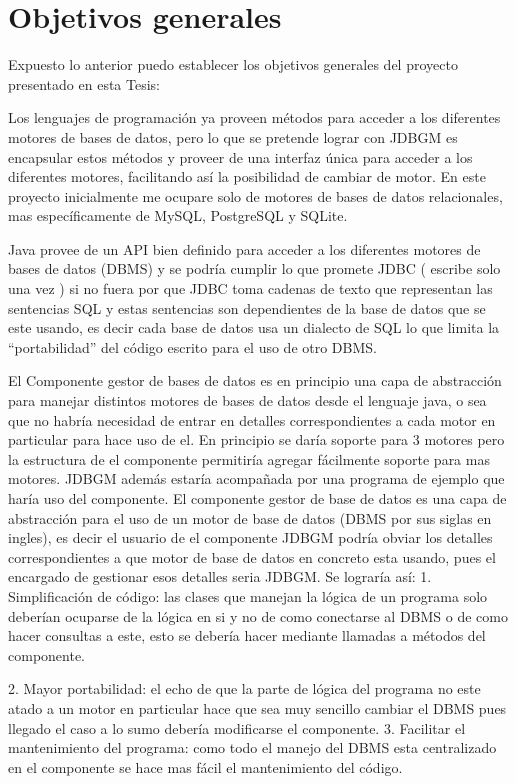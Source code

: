 \section{Objetivos generales}
Expuesto lo anterior puedo establecer los objetivos generales del proyecto presentado en esta Tesis:

Los lenguajes de programación ya proveen métodos para acceder a los diferentes
motores de bases de datos, pero lo que se pretende lograr con JDBGM es encapsular estos
métodos y proveer de una interfaz única para acceder a los diferentes motores, facilitando
así la posibilidad de cambiar de motor. En este proyecto inicialmente me ocupare solo de
motores de bases de datos relacionales, mas específicamente de MySQL, PostgreSQL y
SQLite.


Java provee de un API bien definido para acceder a los diferentes motores de
bases de datos (DBMS) y se podría cumplir lo que promete JDBC ( escribe solo una
vez ) si no fuera por que JDBC toma cadenas de texto que representan las sentencias
SQL y estas sentencias son dependientes de la base de datos que se este usando, es
decir cada base de datos usa un dialecto de SQL lo que limita la “portabilidad” del
código escrito para el uso de otro DBMS.


El Componente gestor de bases de datos es en principio una capa de abstracción para manejar distintos motores de bases de datos desde el lenguaje java, o sea que no habría necesidad de entrar en detalles correspondientes a cada motor en particular para hace uso de el. En principio se daría soporte para 3 motores pero  la estructura de el componente permitiría agregar fácilmente soporte para mas motores. JDBGM además estaría acompañada por una programa de ejemplo que haría uso del componente.
 El componente gestor de base  de datos es una capa de abstracción para el uso de un motor de base de datos (DBMS por sus siglas en ingles), es decir el usuario de el componente JDBGM podría obviar los detalles correspondientes a que motor de base de datos en concreto esta usando, pues el encargado de gestionar esos detalles seria JDBGM. Se lograría así:
1. Simplificación de código: las clases que manejan la lógica de un programa solo deberían ocuparse de la lógica en si y no de como conectarse al DBMS o de como hacer consultas a este, esto se debería hacer mediante llamadas a métodos del componente.

2. Mayor portabilidad: el echo de que la parte de lógica del programa no este atado a un motor en particular hace que sea muy sencillo cambiar el DBMS pues llegado el caso a lo sumo debería modificarse el componente.
3. Facilitar el mantenimiento del programa: como todo el manejo del DBMS esta centralizado en el componente se hace mas fácil el mantenimiento del código.

